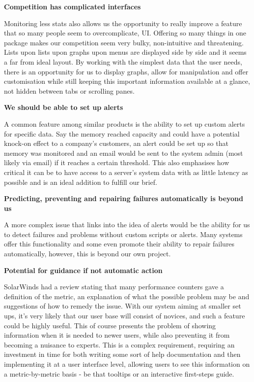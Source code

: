 \documentclass{l3proj}
\begin{document}
\textbf{Competition has complicated interfaces}

Monitoring less stats also allows us the opportunity to really improve a feature that so many people seem to overcomplicate, UI. Offering so many things in one package makes our competition seem very bulky, non-intuitive and threatening. Lists upon lists upon graphs upon menus are displayed side by side and it seems a far from ideal layout. By working with the simplest data that the user needs, there is an opportunity for us to display graphs, allow for manipulation and offer customisation while still keeping this important information available at a glance, not hidden between tabs or scrolling panes.

\textbf{We should be able to set up alerts}

A common feature among similar products is the ability to set up custom alerts for specific data. Say the memory reached capacity and could have a potential knock-on effect to a company’s customers, an alert could be set up so that memory was monitored and an email would be sent to the system admin (most likely via email) if it reaches a certain threshold. This also emphasises how critical it can be to have access to a server’s system data with as little latency as possible and is an ideal addition to fulfill our brief.

\textbf{Predicting, preventing and repairing failures automatically is beyond us}

A more complex issue that links into the idea of alerts would be the ability for us to detect failures and problems without custom scripts or alerts. Many systems offer this functionality and some even promote their ability to repair failures automatically, however, this is beyond our own project.

\textbf{Potential for guidance if not automatic action}

SolarWinds had a review stating that many performance counters gave a definition of the metric, an explanation of what the possible problem may be and suggestions of how to remedy the issue. With our system aiming at smaller set ups, it’s very likely that our user base will consist of novices, and such a feature could be highly useful. This of course presents the problem of showing information when it is needed to newer users, while also preventing it from becoming a nuisance to experts. This is a complex requirement, requiring an investment in time for both writing some sort of help documentation and then implementing it at a user interface level, allowing users to see this information on a metric-by-metric basis - be that tooltips or an interactive first-steps guide.
\end{document}
